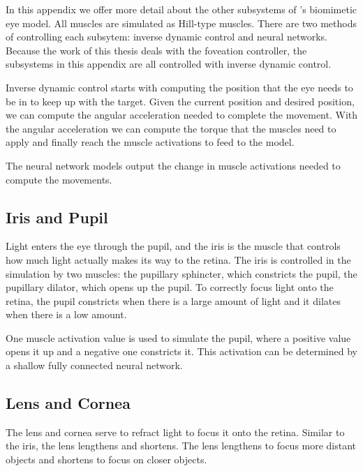 \documentclass[../taasin.tex]{subfiles}
\begin{document}
\label{appendix:eye}

In this appendix we offer more detail about the other subsystems of \cite{Arjun}'s biomimetic eye model. All muscles are simulated as Hill-type muscles. There are two methods of controlling each subsytem: inverse dynamic control and neural networks. Because the work of this thesis deals with the foveation controller, the subsystems in this appendix are all controlled with inverse dynamic control.

Inverse dynamic control starts with computing the position that the eye needs to be in to keep up with the target. Given the current position and desired position, we can compute the angular acceleration needed to complete the movement. With the angular acceleration we can compute the torque that the muscles need to apply and finally reach the muscle activations to feed to the model.

The neural network models output the change in muscle activations needed to compute the movements.



\subsection{Iris and Pupil}

Light enters the eye through the pupil, and the iris is the muscle that controls how much light actually makes its way to the retina. The iris is controlled in the simulation by two muscles: the pupillary sphincter, which constricts the pupil, the pupillary dilator, which opens up the pupil. To correctly focus light onto the retina, the pupil constricts when there is a large amount of light and it dilates when there is a low amount. 

One muscle activation value is used to simulate the pupil, where a positive value opens it up and a negative one constricts it. This activation can be determined by a shallow fully connected neural network. 


\subsection{Lens and Cornea}

The lens and cornea serve to refract light to focus it onto the retina. Similar to the iris, the lens lengthens and shortens. The lens lengthens to focus more distant objects and shortens to focus on closer objects. 
\end{document}
